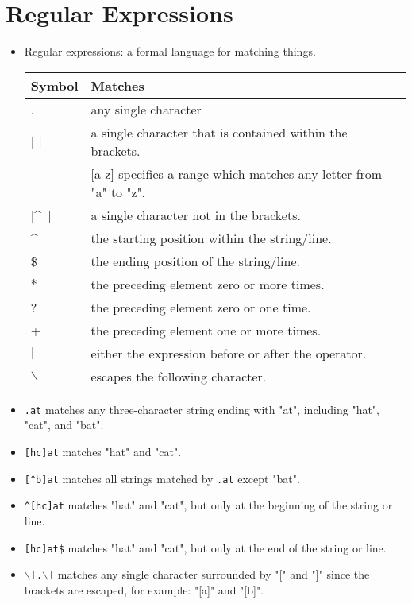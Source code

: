 \documentclass[a4paper,landscape,headrule,footrule,xetex]{foils}
\begin{document}
\section{Regular Expressions}

\begin{itemize}
\item Regular expressions: a formal language for matching things.
\\[2ex]
  \begin{tabular}{ll}
    Symbol & Matches \\ \hline
    . & any single character\\
    {[ ]} & a single character that is contained within the brackets. \\
    & {[a-z]} specifies a range which matches any  letter from "a" to "z".\\
    {[\textasciicircum ~]} & 	a single character not in the brackets. \\
    \textasciicircum 	& the starting position within the string/line. \\
    \$ 	&  the ending position of the string/line. \\
    $*$ &	the preceding element zero or more times. \\
    ? &	 the preceding element zero or one time. \\
    + &	 the preceding element one or more times. \\
    $|$ &  either the expression before or after the operator. \\
    $\backslash$ & escapes the following character. \\
  \end{tabular}

\end{itemize}

\begin{itemize}
\item  \texttt{.at} matches any three-character string ending with "at", including "hat", "cat", and "bat".
\item \texttt{[hc]at} matches "hat" and "cat".
\item \texttt{[\textasciicircum{}b]at} matches all strings matched by \texttt{.at} except "bat".
\item \texttt{\textasciicircum{}[hc]at} matches "hat" and "cat", but only at the beginning of the string or line.
\item \texttt{[hc]at\$} matches "hat" and "cat", but only at the end of the string or line.
\item \texttt{$\backslash$[.$\backslash$]} matches any single character surrounded by "[" and "]" since the brackets are escaped, for example: "[a]" and "[b]".
\end{itemize}
\end{document}
